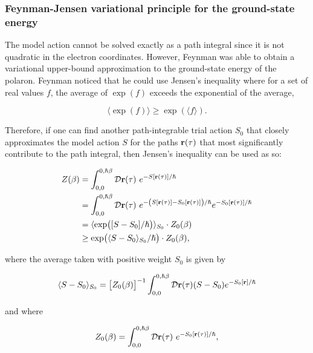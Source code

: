 \subsubsection{Feynman-Jensen variational principle for the ground-state energy}

The model action cannot be solved exactly as a path integral since it is not quadratic in the electron coordinates. However, Feynman was able to obtain a variational upper-bound approximation to the ground-state energy of the polaron. Feynman noticed that he could use Jensen's inequality where for a set of real values $f$, the average of $\exp(f)$ exceeds the exponential of the average,

\begin{equation}
    \langle \exp(f) \rangle \geq \exp(\langle f \rangle).
\end{equation}

Therefore, if one can find another path-integrable trial action $S_0$ that closely approximates the model action $S$ for the paths $\vb{r}(\tau)$ that most significantly contribute to the path integral, then Jensen's inequality can be used as so:

\begin{equation}
    \begin{aligned}
        Z(\beta) &= \int_{0, 0}^{0, \hslash\beta} \mathcal{D} \vb{r}(\tau)\ e^{-S[\mathbf{r}(\tau)]/\hslash} \\ &= \int_{0, 0}^{0, \hslash\beta} \mathcal{D} \vb{r}(\tau)\ e^{-\left(S[\mathbf{r}(\tau)] - S_0[\mathbf{r}(\tau)]\right) / \hslash} e^{-S_0[\mathbf{r}(\tau)]/\hslash} \\
        &= \langle \exp( [S - S_0]  / \hslash) \rangle_{S_0} \cdot Z_0(\beta) \\
        &\geq \exp(\langle S - S_0 \rangle_{S_0} / \hslash) \cdot Z_0(\beta) ,
    \end{aligned}
\end{equation}

where the average taken with positive weight $S_0$ is given by

\begin{equation}
    \langle S-S_0 \rangle_{S_0} = \left[ Z_0(\beta) \right]^{-1} \int_{0, 0}^{0, \hslash\beta} \mathcal{D}\vb{r}(\tau) (S-S_0) e^{-S_0[\vb{r}]/ \hslash}
\end{equation}

and where

\begin{equation}
    Z_0(\beta) = \int_{0, 0}^{0, \hslash\beta} \mathcal{D} \vb{r}(\tau)\ e^{-S_0[\mathbf{r}(\tau)]/\hslash} ,
\end{equation}

